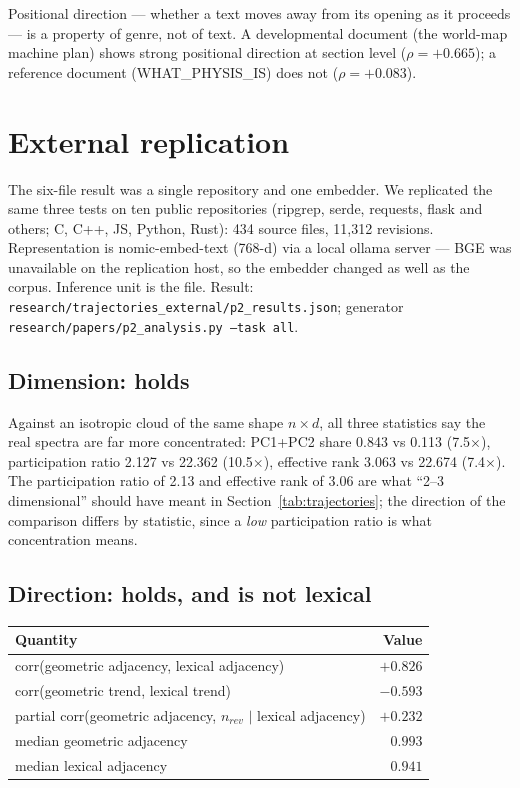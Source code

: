 \documentclass[11pt]{article}
\begin{document}
Positional direction --- whether a text moves away from its opening as it
proceeds --- is a property of genre, not of text. A developmental document
(the world-map machine plan) shows strong positional direction at section
level ($\rho = +0.665$); a reference document (WHAT\_PHYSIS\_IS) does not
($\rho = +0.083$).

\section{External replication}\label{sec:external}

The six-file result was a single repository and one embedder. We replicated
the same three tests on ten public repositories (ripgrep, serde, requests,
flask and others; C, C++, JS, Python, Rust): 434 source files, 11{,}312
revisions. Representation is nomic-embed-text (768-d) via a local ollama
server --- BGE was unavailable on the replication host, so the embedder
changed as well as the corpus. Inference unit is the file. Result:
\texttt{research/trajectories\_external/p2\_results.json}; generator
\texttt{research/papers/p2\_analysis.py --task all}.

\subsection{Dimension: holds}

Against an isotropic cloud of the same shape $n \times d$, all three
statistics say the real spectra are far more concentrated:
PC1+PC2 share 0.843 vs 0.113 (7.5$\times$), participation ratio 2.127 vs
22.362 (10.5$\times$), effective rank 3.063 vs 22.674 (7.4$\times$). The
participation ratio of 2.13 and effective rank of 3.06 are what ``2--3
dimensional'' should have meant in Section~\ref{tab:trajectories}; the
direction of the comparison differs by statistic, since a \emph{low}
participation ratio is what concentration means.

\subsection{Direction: holds, and is not lexical}

\begin{center}
\begin{tabular}{lr}
\toprule
\textbf{Quantity} & \textbf{Value} \\
\midrule
corr(geometric adjacency, lexical adjacency) & $+0.826$ \\
corr(geometric trend, lexical trend) & $-0.593$ \\
partial corr(geometric adjacency, $n_{rev}$ $|$ lexical adjacency) & $+0.232$ \\
median geometric adjacency & $0.993$ \\
median lexical adjacency & $0.941$ \\
\bottomrule
\end{tabular}
\end{center}
\end{document}
